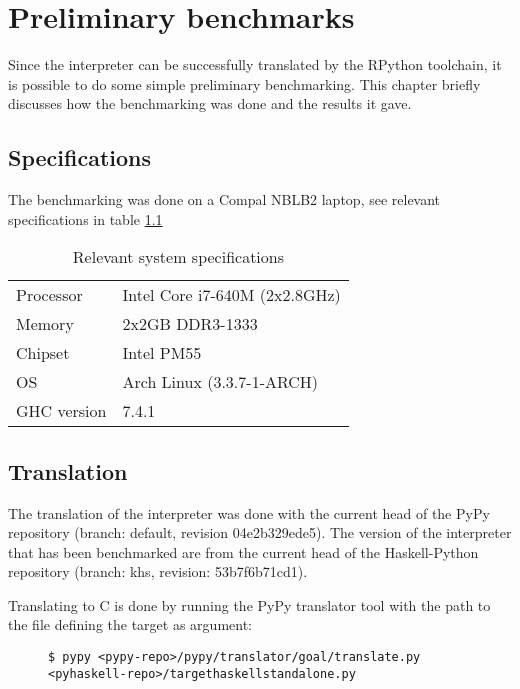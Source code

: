 
\chapter{Preliminary benchmarks}
\label{chap:bench}

Since the interpreter can be successfully translated by the RPython toolchain, 
it is possible to do some simple preliminary benchmarking. This chapter briefly 
discusses how the benchmarking was done and the results it gave.

\section{Specifications}

The benchmarking was done on a Compal NBLB2 laptop, see relevant specifications
in table \ref{tab:specs}

\begin{table}[H]
\centering
\begin{tabular}{l|l}
\hline
\hline
Processor   & Intel Core i7-640M (2x2.8GHz) \\
Memory      & 2x2GB DDR3-1333 \\
Chipset     & Intel PM55 \\
OS          & Arch Linux (3.3.7-1-ARCH) \\
GHC version & 7.4.1 \\
\hline
\end{tabular}
\caption{Relevant system specifications}
\label{tab:specs}
\end{table}

\section{Translation}

The translation of the interpreter was done with the current head of the 
PyPy repository (branch: default, revision 04e2b329ede5). The version of the interpreter that has
been benchmarked are from the current head of the Haskell-Python repository (branch: khs,
revision: 53b7f6b71cd1).

Translating to C is done by running the PyPy translator tool with the path to the
file defining the target as argument:

\begin{figure}[H]
\lstset{ %
language=bash,
}
\begin{lstlisting}
$ pypy <pypy-repo>/pypy/translator/goal/translate.py <pyhaskell-repo>/targethaskellstandalone.py
\end{lstlisting}

\end{figure}

